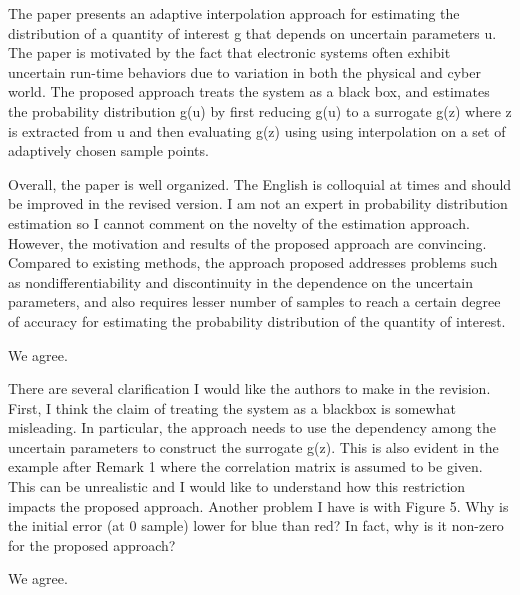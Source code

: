 \begin{reviewer}
The paper presents an adaptive interpolation approach for estimating the
distribution of a quantity of interest g that depends on uncertain parameters u.
The paper is motivated by the fact that electronic systems often  exhibit
uncertain run-time behaviors due to variation in both the physical and cyber
world. The proposed approach treats the system as a black box, and estimates the
probability distribution g(u) by first reducing g(u) to a surrogate g(z) where z
is extracted from u and then evaluating g(z) using using interpolation on a set
of adaptively chosen sample points.

Overall, the paper is well organized. The English is colloquial at times and
should be improved in the revised version. I am not an expert in probability
distribution estimation so I cannot comment on the novelty of the estimation
approach. However, the motivation and results of the proposed approach are
convincing. Compared to existing methods, the approach proposed addresses
problems such as nondifferentiability and discontinuity in the dependence on the
uncertain parameters, and also requires lesser number of samples to reach a
certain degree of accuracy for estimating the probability distribution of the
quantity of interest.
\end{reviewer}

\begin{authors}
We agree.

\begin{actions}
\end{actions}
\end{authors}

\begin{reviewer}
There are several clarification I would like the authors to make in the
revision. First, I think the claim of treating the system as a blackbox is
somewhat misleading. In particular, the approach needs to use the dependency
among the uncertain parameters to construct the surrogate g(z). This is also
evident in the example after Remark 1 where the correlation matrix is assumed to
be given. This can be unrealistic and I would like to understand how this
restriction impacts the proposed approach. Another problem I have is with Figure
5. Why is the initial error (at 0 sample) lower for blue than red? In fact, why
is it non-zero for the proposed approach?
\end{reviewer}

\begin{authors}
We agree.

\begin{actions}
\end{actions}
\end{authors}
